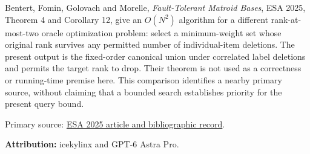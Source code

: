 Bentert, Fomin, Golovach and Morelle, \emph{Fault-Tolerant Matroid Bases}, ESA 2025, Theorem 4 and Corollary 12, give an \(O(N^2)\) algorithm for a different rank-at-most-two oracle optimization problem: select a minimum-weight set whose original rank survives any permitted number of individual-item deletions. The present output is the fixed-order canonical union under correlated label deletions and permits the target rank to drop. Their theorem is not used as a correctness or running-time premise here. This comparison identifies a nearby primary source, without claiming that a bounded search establishes priority for the present query bound.

Primary source: \href{https://doi.org/10.4230/LIPIcs.ESA.2025.83}{ESA 2025 article and bibliographic record}.

\textbf{Attribution:} icekylinx and GPT-6 Astra Pro.
